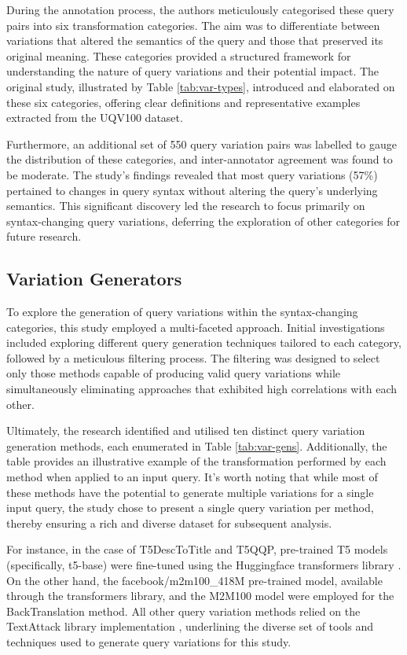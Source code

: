 During the annotation process, the authors meticulously categorised these query pairs into six transformation categories. The aim was to differentiate between variations that altered the semantics of the query and those that preserved its original meaning. These categories provided a structured framework for understanding the nature of query variations and their potential impact. The original study, illustrated by Table \ref{tab:var-types}, introduced and elaborated on these six categories, offering clear definitions and representative examples extracted from the UQV100 dataset.



Furthermore, an additional set of 550 query variation pairs was labelled to gauge the distribution of these categories, and inter-annotator agreement was found to be moderate. The study's findings revealed that most query variations (57\%) pertained to changes in query syntax without altering the query's underlying semantics. This significant discovery led the research to focus primarily on syntax-changing query variations, deferring the exploration of other categories for future research.

\subsection{Variation Generators}
To explore the generation of query variations within the syntax-changing categories, this study employed a multi-faceted approach. Initial investigations included exploring different query generation techniques tailored to each category, followed by a meticulous filtering process. The filtering was designed to select only those methods capable of producing valid query variations while simultaneously eliminating approaches that exhibited high correlations with each other.


Ultimately, the research identified and utilised ten distinct query variation generation methods, each enumerated in Table \ref{tab:var-gens}. Additionally, the table provides an illustrative example of the transformation performed by each method when applied to an input query. It's worth noting that while most of these methods have the potential to generate multiple variations for a single input query, the study chose to present a single query variation per method, thereby ensuring a rich and diverse dataset for subsequent analysis.

For instance, in the case of T5DescToTitle and T5QQP, pre-trained T5 models (specifically, t5-base) were fine-tuned using the Huggingface transformers library \cite{hugging}. On the other hand, the facebook/m2m100\_418M pre-trained model, available through the transformers library, and the M2M100 model \cite{translation} were employed for the BackTranslation method. All other query variation methods relied on the TextAttack library implementation \cite{textattack}, underlining the diverse set of tools and techniques used to generate query variations for this study.

